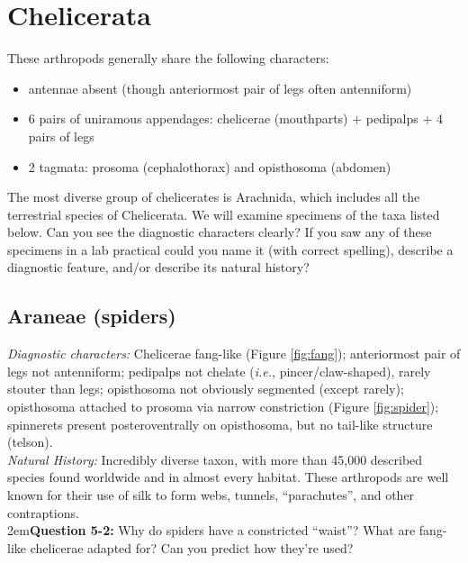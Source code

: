 \documentclass[letterpaper, 11pt]{article}
\begin{document}
\section{Chelicerata}
These arthropods generally share the following characters: 
\begin{itemize}
\item antennae absent (though anteriormost pair of legs often antenniform)
\item 6 pairs of uniramous appendages: chelicerae (mouthparts) + pedipalps + 4 pairs of legs
\item 2 tagmata: prosoma (cephalothorax) and opisthosoma (abdomen)
\end{itemize}
The most diverse group of chelicerates is Arachnida, which includes all the terrestrial species of Chelicerata. We will examine specimens of the taxa listed below. Can you see the diagnostic characters clearly? If you saw any of these specimens in a lab practical could you name it (with correct spelling), describe a diagnostic feature, and/or describe its natural history?

\subsection{Araneae (spiders)}
\noindent{}\textit{Diagnostic characters:} Chelicerae fang-like (Figure \ref{fig:fang}); anteriormost pair of legs not antenniform; pedipalps not chelate (\textit{i.e.}, pincer/claw-shaped), rarely stouter than legs; opisthosoma not obviously segmented (except rarely); opisthosoma attached to prosoma via narrow constriction (Figure \ref{fig:spider}); spinnerets present posteroventrally on opisthosoma, but no tail-like structure (telson).\\

\noindent{}\textit{Natural History:} Incredibly diverse taxon, with more than 45,000 described species found worldwide and in almost every habitat. These arthropods are well known for their use of silk to form webs, tunnels, ``parachutes'', and other contraptions.\\

\hangindent2em\textbf{Question 5-2:} Why do spiders have a constricted ``waist''? What are fang-like chelicerae adapted for? Can you predict how they're used?
\end{document}
